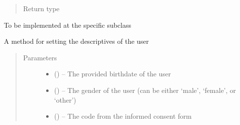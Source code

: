 \documentclass[letterpaper,10pt,english]{sphinxmanual}
\begin{document}
\begin{fulllineitems}
\begin{fulllineitems}
\begin{quote}
\begin{description}
\item[{Return type}] \leavevmode
{\hyperref[\detokenize{instance:instance.Instance}]{}}

\end{description}\end{quote}

\end{fulllineitems}


\begin{fulllineitems}
\label{\detokenize{user:user.User.provide_learned_items}}
To be implemented at the specific subclass

\end{fulllineitems}


\begin{fulllineitems}
\label{\detokenize{user:user.User.set_descriptives}}
A method for setting the descriptives of the user
\begin{quote}\begin{description}
\item[{Parameters}] \leavevmode\begin{itemize}
\item {} 
 () -- The provided birthdate of the user

\item {} 
 (\href{https://docs.python.org/2/library/string.html\#module-string}{}) -- The gender of the user (can be either `male', `female', or `other')

\item {} 
 (\href{https://docs.python.org/2/library/string.html\#module-string}{}) -- The code from the informed consent form

\end{itemize}

\end{description}\end{quote}

\end{fulllineitems}


\end{fulllineitems}
\end{document}

